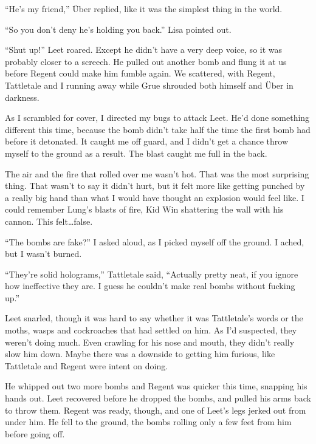``He's my friend,'' \"{U}ber replied, like it was the simplest thing in the world.



``So you don't deny he's holding you back.'' Lisa pointed out.



``Shut up!'' Leet roared.  Except he didn't have a very deep voice, so it was probably closer to a screech.  He pulled out another bomb and flung it at us before Regent could make him fumble again.  We scattered, with Regent, Tattletale and I running away while Grue shrouded both himself and \"{U}ber in darkness.



As I scrambled for cover, I directed my bugs to attack Leet.  He'd done something different this time, because the bomb didn't take half the time the first bomb had before it detonated.  It caught me off guard, and I didn't get a chance throw myself to the ground as a result.  The blast caught me full in the back.



The air and the fire that rolled over me wasn't hot.  That was the most surprising thing.  That wasn't to say it didn't hurt, but it felt more like getting punched by a really big hand than what I would have thought an explosion would feel like.  I could remember Lung's blasts of fire, Kid Win shattering the wall with his cannon.  This felt\ldots false.



``The bombs are fake?'' I asked aloud, as I picked myself off the ground.  I ached, but I wasn't burned.



``They're solid holograms,'' Tattletale said, ``Actually pretty neat, if you ignore how ineffective they are.  I guess he couldn't make real bombs without fucking up.''



Leet snarled, though it was hard to say whether it was Tattletale's words or the moths, wasps and cockroaches that had settled on him.  As I'd suspected, they weren't doing much.  Even crawling for his nose and mouth, they didn't really slow him down.  Maybe there was a downside to getting him furious, like Tattletale and Regent were intent on doing.



He whipped out two more bombs and Regent was quicker this time, snapping his hands out.  Leet recovered before he dropped the bombs, and pulled his arms back to throw them.  Regent was ready, though, and one of Leet's legs jerked out from under him.  He fell to the ground, the bombs rolling only a few feet from him before going off.



